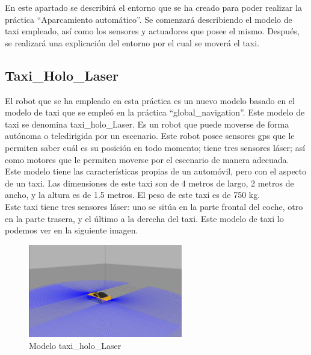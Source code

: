 En este apartado se describirá el entorno que se ha creado para poder realizar la práctica ``Aparcamiento automático''. Se comenzará describiendo el modelo de taxi empleado, así como los sensores y actuadores que posee el mismo. Después, se realizará una explicación del entorno por el cual se moverá el taxi.

\subsection{Taxi\_Holo\_Laser}
El robot que se ha empleado en esta práctica es un nuevo modelo basado en el modelo de taxi que se empleó en la práctica ``global\_navigation''. Este modelo de taxi se denomina taxi\_holo\_Laser. Es un robot que puede moverse de forma autónoma o teledirigida por un escenario. Este robot posee sensores \acrshort{gps} que le permiten saber cuál es su posición en todo momento; tiene tres sensores láser; así como motores que le permiten moverse por el escenario de manera adecuada.\\

Este modelo tiene las características propias de un automóvil, pero con el aspecto de un taxi. Las dimensiones de este taxi son de 4 metros de largo, 2 metros de ancho, y la altura es de 1.5 metros. El peso de este taxi es de 750 kg.  \\

Este taxi tiene tres sensores láser: uno se sitúa en la parte frontal del coche, otro en la parte trasera, y el último a la derecha del taxi. Este modelo de taxi lo podemos ver en la siguiente imagen.\\

\begin{figure}[H]
  \begin{center}
    \includegraphics[width=0.6\textwidth]{figures/Autopark/taxiAutopark.png}
		\caption{Modelo taxi\_holo\_Laser}
		\label{fig.taxiAutopark}
		\end{center}
\end{figure}

